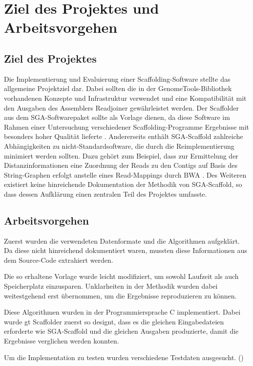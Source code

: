 \documentclass[a4paper,10pt,parskip]{scrartcl}
\begin{document}
\section{Ziel des Projektes und Arbeitsvorgehen}
\subsection{Ziel des Projektes}
Die Implementierung und Evaluierung einer Scaffolding-Software stellte
das allgemeine Projektziel dar. Dabei sollten die in der
GenomeTools-Bibliothek \cite{Gremme:2013} vorhandenen Konzepte und
Infrastruktur verwendet und eine Kompatibilität mit den Ausgaben des
Assemblers Readjoiner \cite{Gonnella:2012gn} gewährleistet werden. Der
Scaffolder aus dem SGA-Softwarepaket \cite{Simpson:2012ef} sollte als
Vorlage dienen, da diese Software im Rahmen einer Untersuchung
verschiedener Scaffolding-Programme Ergebnisse mit besonders hoher
Qualität lieferte \cite{Hunt:2014dh}. Andererseits enthält
SGA-Scaffold zahlreiche Abhängigkeiten zu nicht-Standardsoftware, die
durch die Reimplementierung minimiert werden sollten. Dazu gehört zum
Beispiel, dass zur Ermittelung der Distanzinformationen eine Zuordnung
der Reads zu den Contigs auf Basis des String-Graphen erfolgt anstelle
eines Read-Mappings durch BWA \cite{Li:2009}. Des Weiteren existiert
keine hinreichende Dokumentation der Methodik von SGA-Scaffold, so
dass dessen Aufklärung einen zentralen Teil des Projektes umfasste.

\subsection{Arbeitsvorgehen}
Zuerst wurden die verwendeten Datenformate und die Algorithmen
aufgeklärt. Da diese nicht hinreichend dokumentiert waren, mussten
diese Informationen aus dem Source-Code \cite{source} extrahiert werden.

Die so erhaltene Vorlage wurde leicht modifiziert, um sowohl Laufzeit
als auch Speicherplatz einzusparen. Unklarheiten in der Methodik wurden
dabei weitestgehend erst übernommen, um die Ergebnisse reproduzieren
zu können.

Diese Algorithmen wurden in der Programmiersprache C
implementiert. Dabei wurde gt Scaffolder zuerst so designt, dass es
die gleichen Eingabedateien erforderte wie SGA-Scaffold und die
gleichen Ausgaben produzierte, damit die Ergebnisse verglichen werden
konnten.

Um die Implementation zu testen wurden verschiedene Testdaten
ausgesucht. ()
\end{document}
